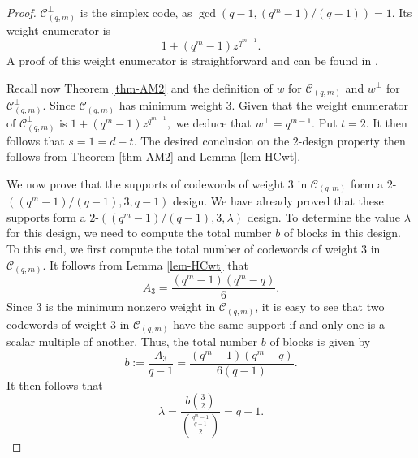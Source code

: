 \documentclass[1p,final]{elsarticle}
\newcommand{\C}{{\mathcal{C}}}
\begin{document}
\begin{proof}
$\C_{(q,m)}^\perp$ is the simplex code, as $\gcd(q-1, (q^{m}-1)/(q-1))=1$. Its weight enumerator
is
$$
1+(q^m-1)z^{q^{m-1}}.
$$
A proof of this weight enumerator is straightforward and can be found in \cite[Theorem 15]{DY13}. 

Recall now Theorem \ref{thm-AM2} and the definition of $w$ for $\C_{(q,m)}$ 
and $w^\perp$ for $\C_{(q,m)}^\perp$. Since $\C_{(q,m)}$ has minimum weight 
$3$. Given that the weight enumerator of $\C_{(q,m)}^\perp$ is 
$1+(q^m-1)z^{q^{m-1}},$ we deduce that $w^\perp=q^{m-1}$. Put $t=2$. It then 
follows that $s=1=d-t$. The desired conclusion on the $2$-design property 
then follows from Theorem \ref{thm-AM2} and Lemma \ref{lem-HCwt}. 

We now prove that the supports of codewords of weight $3$ in $\C_{(q,m)}$ 
form a $2$-$((q^m-1)/(q-1), 3, q-1)$ design. We have already proved that 
these supports form a $2$-$((q^m-1)/(q-1), 3, \lambda)$ design. To determine the 
value $\lambda$ for this design, we need to compute the total number $b$ 
of blocks in this design. To this end, we first compute the total number 
of codewords of weight $3$ in $\C_{(q,m)}$. It follows from Lemma \ref{lem-HCwt} 
that 
$$ 
A_3=\frac{(q^m-1)(q^m-q)}{6}. 
$$  
Since $3$ is the minimum nonzero weight in $\C_{(q,m)}$, it is easy to see that 
two codewords of weight $3$ in $\C_{(q,m)}$ have the same support if and only 
one is a scalar multiple of another. Thus, the total number $b$ of blocks is given by  
$$ 
b:=\frac{A_3}{q-1}=\frac{(q^m-1)(q^m-q)}{6(q-1)}. 
$$ 
It then follows that 
$$ 
\lambda=\frac{b\binom{3}{2}}{\binom{\frac{q^m-1}{q-1}}{2}}=q-1. 
$$


\end{proof}
\end{document}
